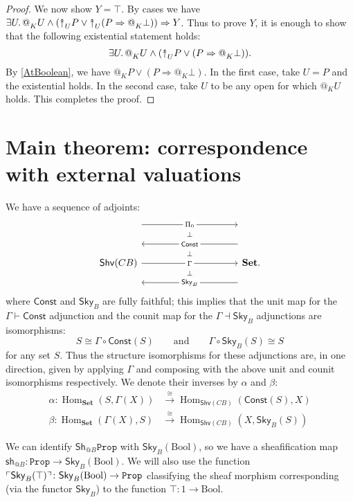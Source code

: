 \documentclass[11pt, oneside, article]{memoir}
\makeatletter
\theoremstyle{plain}
\theoremstyle{definition}
\theoremstyle{remark}
\DeclarePairedDelimiter{\classify}{\ulcorner}{\urcorner}
\DeclareMathOperator{\Hom}{Hom}
\newcommand{\const}[1]{\mathtt{#1}}
\newcommand{\Set}[1]{\mathrm{#1}}
\newcommand{\Cat}[1]{\mathbf{#1}}
\newcommand{\Fun}[1]{\mathsf{#1}}
\newcommand{\smset}{\Cat{Set}}
\newcommand{\To}[1]{\xrightarrow{#1}}
\newcommand{\Shv}{\Fun{Shv}}
\newcommand{\Prop}{\const{Prop}}
\newcommand{\asSh}{\Fun{Sh}} %
\newcommand{\toSh}{\Fun{sh}} %
\newcommand{\BaseSpace}{B}
\newcommand{\CB}{C\BaseSpace}
\newcommand{\Const}{\Fun{Const}}
\newcommand{\Sky}{\Fun{Sky}}
\newcommand{\AtSymbol}{{@}}
\newcommand{\InSymbol}{{\upclose}}%
\newcommand{\At}[2][]{\AtSymbol^{#1}_{#2}}
\newcommand{\In}[2][]{\InSymbol^{#1}_{#2}}
\newcommand{\AtInline}[1]{@{#1}}
\newcommand{\upclose}{{\rotatebox[origin=c]{90}{$\twoheadrightarrow$}}}
\newcommand{\imp}{\Rightarrow}
\newcommand{\Bool}{\Set{Bool}}
\makeatother
\begin{document}
\begin{proof}
We now show $Y=\top$. By cases we have $\exists U\ldotp\At{K}U\wedge(\In{U}P\vee\In{U}(P\imp\At{K}\bot))\imp Y$. Thus to prove $Y$, it is enough to show that the following existential statement holds:
\[\exists U\ldotp\At{K}U\wedge(\In{U}P\vee(P\imp\At{K}\bot)).\]
By \cref{AtBoolean}, we have $\At{K}P\vee (P\imp\At{K}\bot)$. In the first case, take $U=P$ and the existential holds. In the second case, take $U$ to be any open for which $\At{K}U$ holds. This completes the proof.
\end{proof}


\section{Main theorem: correspondence with external valuations}\label{sec.main_thm}

We have a sequence of adjoints:
\[
\begin{tikzcd}[column sep=100pt]
	\Shv(\CB)
		\ar[r, shift left=40pt, "\Pi_0" description]
		\ar[r, shift left=0pt, "\Gamma" description]
		\ar[r, shift left=30pt, phantom, "\scriptstyle\bot"]
		\ar[r, shift left=10pt, phantom, "\scriptstyle\bot"]
		\ar[r, shift right=10pt, phantom, "\scriptstyle\bot"]
	&
	\smset.
		\ar[l, shift right=20pt, "\Const" description]
		\ar[l, shift left=20pt, "\Sky_B" description]
\end{tikzcd}
\]
where $\Const$ and $\Sky_B$ are fully faithful; this implies that the unit map for the $\Gamma\vdash\Const$ adjunction and the counit map for the $\Gamma\dashv\Sky_B$ adjunctions are isomorphisms:
\[
	S\cong\Gamma\circ\Const(S)
	\qquad\text{and}\qquad
	\Gamma\circ\Sky_B(S)\cong S
\]
for any set $S$. Thus the structure isomorphisms for these adjunctions are, in one direction, given by applying $\Gamma$ and composing with the above unit and counit isomorphisms respectively. We denote their inverses by $\alpha$ and $\beta$:
\begin{align*}
	\alpha\colon\Hom_\smset(S,\Gamma(X))&\To{\cong}\Hom_{\Shv(\CB)}(\Const(S),X)\\
	\beta\colon\Hom_\smset(\Gamma(X),S)&\To{\cong}\Hom_{\Shv(\CB)}(X,\Sky_B(S))
\end{align*}

We can identify $\asSh_{\AtInline{B}}\Prop$ with $\Sky_B(\Bool)$, so we have a sheafification map $\toSh_{\AtInline{B}}\colon\Prop\to\Sky_B(\Bool)$. We will also use the function $\classify{\Sky_B(\top)}\colon\Sky_B(\Bool)\to\Prop$ classifying the sheaf morphism corresponding (via the functor $\Sky_B$) to the function $\top\colon 1\to\Bool$.
\end{document}
